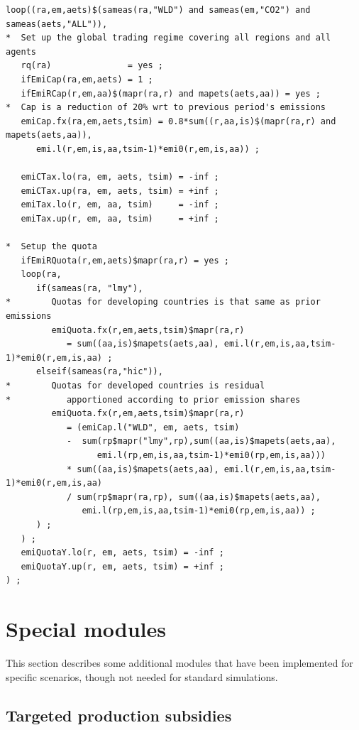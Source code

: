 \documentclass[11pt,letterpaper]{report}
\begin{document}
\begin{lstlisting}[language=GAMS, caption={Example of a cap and trade regime}]
loop((ra,em,aets)$(sameas(ra,"WLD") and sameas(em,"CO2") and sameas(aets,"ALL")),
*  Set up the global trading regime covering all regions and all agents
   rq(ra)               = yes ;
   ifEmiCap(ra,em,aets) = 1 ;
   ifEmiRCap(r,em,aa)$(mapr(ra,r) and mapets(aets,aa)) = yes ;
*  Cap is a reduction of 20% wrt to previous period's emissions
   emiCap.fx(ra,em,aets,tsim) = 0.8*sum((r,aa,is)$(mapr(ra,r) and mapets(aets,aa)),
      emi.l(r,em,is,aa,tsim-1)*emi0(r,em,is,aa)) ;

   emiCTax.lo(ra, em, aets, tsim) = -inf ;
   emiCTax.up(ra, em, aets, tsim) = +inf ;
   emiTax.lo(r, em, aa, tsim)     = -inf ;
   emiTax.up(r, em, aa, tsim)     = +inf ;

*  Setup the quota
   ifEmiRQuota(r,em,aets)$mapr(ra,r) = yes ;
   loop(ra,
      if(sameas(ra, "lmy"),
*        Quotas for developing countries is that same as prior emissions
         emiQuota.fx(r,em,aets,tsim)$mapr(ra,r)
            = sum((aa,is)$mapets(aets,aa), emi.l(r,em,is,aa,tsim-1)*emi0(r,em,is,aa) ;
      elseif(sameas(ra,"hic")),
*        Quotas for developed countries is residual
*           apportioned according to prior emission shares
         emiQuota.fx(r,em,aets,tsim)$mapr(ra,r)
            = (emiCap.l("WLD", em, aets, tsim)
            -  sum(rp$mapr("lmy",rp),sum((aa,is)$mapets(aets,aa),
                  emi.l(rp,em,is,aa,tsim-1)*emi0(rp,em,is,aa)))
            * sum((aa,is)$mapets(aets,aa), emi.l(r,em,is,aa,tsim-1)*emi0(r,em,is,aa)
            / sum(rp$mapr(ra,rp), sum((aa,is)$mapets(aets,aa),
               emi.l(rp,em,is,aa,tsim-1)*emi0(rp,em,is,aa)) ;
      ) ;
   ) ;
   emiQuotaY.lo(r, em, aets, tsim) = -inf ;
   emiQuotaY.up(r, em, aets, tsim) = +inf ;
) ;
\end{lstlisting}

\section{Special modules}
\renewcommand{\theequation}{{Z-}\arabic{equation}}
\setcounter{equation}{0}
\label{sec:SpcMod}

This section describes some additional modules that have been
implemented for specific scenarios, though not needed for
standard simulations.

\subsection{Targeted production subsidies}
\end{document}
